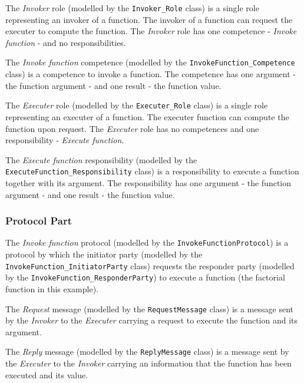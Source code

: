 The \textit{Invoker} role (modelled by the \texttt{Invoker\_Role} class) is a single role representing an invoker of a function.
The invoker of a function can request the executer to compute the function.
The \textit{Invoker} role has one competence - \textit{Invoke function} - and no responsibilities.

The \textit{Invoke function} competence (modelled by the \texttt{InvokeFunction\_Competence} class) is a competence to invoke a function.
The competence has one argument - the function argument - and one result - the function value.

The \textit{Executer} role (modelled by the \texttt{Executer\_Role} class) is a single role representing an executer of a function.
The executer function can compute the function upon request.
The \textit{Executer} role has no competences and one responsibility - \textit{Execute function}.

The \textit{Execute function} responsibility (modelled by the \texttt{ExecuteFunction\_Responsibility} class) is a responsibility to execute a function together with its argument.
The responsibility has one argument - the function argument - and one result - the function value.

\subsubsection*{Protocol Part}

The \textit{Invoke function} protocol (modelled by the \texttt{InvokeFunctionProtocol}) is a protocol by which the initiator party (modelled by the \texttt{InvokeFunction\_InitiatorParty} class) requests the responder party (modelled by the \texttt{InvokeFunction\_ResponderParty}) to execute a function (the factorial function in this example).

The \textit{Request} message (modelled by the \texttt{RequestMessage} class) is a message sent by the \textit{Invoker} to the \textit{Executer} carrying a request to execute the function and its argument.

The \textit{Reply} message (modelled by the \texttt{ReplyMessage} class) is a message sent by the \textit{Executer} to the \textit{Invoker} carrying an information that the function has been executed and its value.

